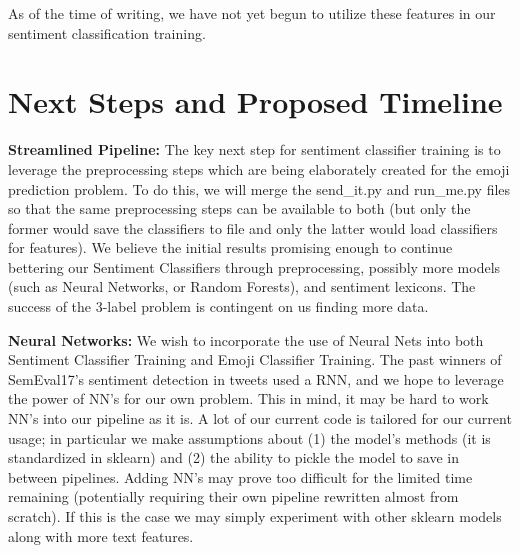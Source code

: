 \documentclass[10pt]{article}
\begin{document}
As of the time of writing, we have not yet begun to utilize these features in our sentiment classification training.





\section{Next Steps and Proposed Timeline}
\textbf{Streamlined Pipeline:}
The key next step for sentiment classifier training is to leverage the preprocessing steps which are being elaborately created for the emoji prediction problem. To do this, we will merge the send\_it.py and run\_me.py files so that the same preprocessing steps can be available to both (but only the former would save the classifiers to file and only the latter would load classifiers for features). We believe the initial results promising enough to continue bettering our Sentiment Classifiers through preprocessing, possibly more models (such as Neural Networks, or Random Forests), and sentiment lexicons. The success of the 3-label problem is contingent on us finding more data.

\textbf{Neural Networks:}
We wish to incorporate the use of Neural Nets into both Sentiment Classifier Training and Emoji Classifier Training. The past winners of SemEval17's sentiment detection in tweets used a RNN, and we hope to leverage the power of NN's for our own problem. This in mind, it may be hard to work NN's into our pipeline as it is. A lot of our current code is tailored for our current usage; in particular we make assumptions about (1) the model's methods (it is standardized in sklearn) and (2) the ability to pickle the model to save in between pipelines. Adding NN's may prove too difficult for the limited time remaining (potentially requiring their own pipeline rewritten almost from scratch). If this is the case we may simply experiment with other sklearn models along with more text features.
\end{document}
